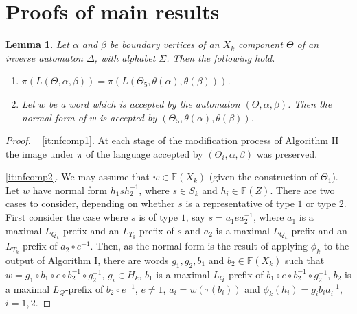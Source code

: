 \documentclass[a4paper,12pt]{article}
\renewcommand{\a}{\alpha }
\renewcommand{\b}{\beta }
\newcommand{\D}{\Delta }
\newcommand{\T}{\Theta }
\renewcommand{\S}{\Sigma }
\renewcommand{\t}{\tau }
\newtheorem{lemma}[theorem]{Lemma}
\numberwithin{equation}{section}
\numberwithin{figure}{section}
\newcommand{\FF}{\ensuremath{\mathbb{F}}}
\newcommand{\be}{\begin{enumerate}}
\newcommand{\ee}{\end{enumerate}}
\begin{document}
\section{Proofs of main results}
\begin{lemma}\label{lem:nfcomp} 
Let $\a$ and $\b$ be boundary vertices of  an $X_k$ component $\T$ of
an inverse automaton $\D$, with alphabet $\S$. Then   the following hold.
\be
\item\label{it:nfcomp1}
  $\pi(L(\T,\a,\b))=\pi(L(\T_5,\theta(\a),\theta(\b)))$.
\item\label{it:nfcomp2} Let $w$ be a word
 which is accepted by the automaton $(\T, \a, \b)$. Then the
normal form of $w$ is accepted by $(\T_5, \theta(\a), \theta(\b))$.
\ee
\end{lemma}
\begin{proof} ~
\ref{it:nfcomp1}.
At each stage of the modification process of Algorithm
II the image under $\pi$ of the language accepted by $(\T_i,\a,\b)$  was
preserved.

\ref{it:nfcomp2}.
We may assume that $w\in \FF(X_k)$ (given the construction of $\T_1$).
Let $w$ have normal form $h_1s h_2^{-1}$, where $s\in S_k$ and $h_i\in \FF(Z)$.
There are two cases to consider, depending on whether $s$ is a
representative of type $1$ or type $2$.
 First consider the case where $s$ is of type $1$, say
 $s= a_1 e a_2^{-1}$, where
$a_1$ is a maximal $L_{Q_k}$-prefix and an $L_{T_k}$-prefix of $s$ and
 $a_2$  is a maximal $L_{Q_k}$-prefix and an $L_{T_k}$-prefix of $a_2\circ e^{-1}$.
 Then, as the normal form is the result of applying $\phi_k$ to the
output of Algorithm I,
 there are words
$g_1, g_2, b_1$ and $b_2\in \FF(X_k)$ such that
$w=g_1\circ b_1\circ e \circ b_2^{-1}\circ g_2^{-1}$,
$g_i\in H_k$, $b_1$ is a maximal $L_Q$-prefix of
$b_1\circ e \circ b_2^{-1}\circ g_2^{-1}$,
$b_2$ is a maximal $L_Q$-prefix of $b_2\circ e^{-1}$, $e\neq 1$,
$a_i=w(\t(b_i))$ and $\phi_k(h_i)=g_ib_ia_i^{-1}$, $i=1,2$.


\end{proof}
\end{document}
